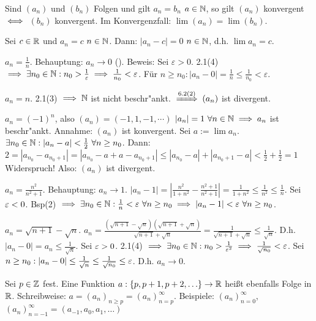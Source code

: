\documentclass[a4paper,twoside,DIV15,BCOR12mm]{scrbook}
\begin{document}
\begin{bemerkung}
Sind $(a_n)$ und $(b_n)$ Folgen und gilt $a_n = b_n$ \ffa $a\in\mathbb{N}$, so gilt $(a_n)$ konvergent $\iff$ $(b_n)$ konvergent. Im Konvergenzfall: $\lim(a_n) = \lim(b_n)$.
\end{bemerkung}

\begin{beispiele}
\item Sei $c \in \mathbb{R}$ und $a_n = c$ \ffa $n\in\mathbb{N}$. Dann: $|a_n - c| =0$ \ffa $n\in\mathbb{N}$, d.h. $\lim{a_n} = c$.
\item $a_n = \frac{1}{n}$. Behauptung: $a_n \to 0$ (). Beweis: Sei $\varepsilon > 0$. 2.1(4) $\implies \exists n_0 \in \mathbb{N}: n_0 > \frac{1}\varepsilon \implies \frac{1}{n_0} < \varepsilon$. Für $n \ge n_0: |a_n - 0| = \frac{1}{n} \le \frac{1}{n_0} < \varepsilon$.
\item $a_n = n$. 2.1(3) $\implies \mathbb{N}$ ist nicht beschr"ankt. $\folgtnach{6.2(2)} (a_n)$ ist divergent.
\item $a_n = (-1)^n$, also $(a_n) = (-1, 1, -1, \cdots)$ $|a_n|=1 \ \forall n\in\mathbb{N} \implies a_n$ ist beschr"ankt. Annahme: $(a_n)$ ist konvergent. Sei $a:=\lim a_n$. $\exists n_0\in\mathbb{N} : |a_n - a| < \frac{1}{2}\ \forall n \ge n_0$. Dann: $2=|a_{n_0}-a_{n_0+1}|=|a_{n_0}-a+a-a_{n_0+1}|\le|a_{n_0}-a|+|a_{n_0+1}-a|<\frac{1}{2} + \frac{1}{2}=1$ Widerspruch! Also: $(a_n)$ ist divergent.
\item $a_n = \frac{n^2}{n^2 + 1}$. Behauptung: $a_n \to 1$. $|a_n-1|=|\frac{n^2}{1+n^2}-\frac{n^2+1}{n^2+1}|=\frac{1}{1+n^2}\le\frac{1}{n^2}\le\frac{1}{n}$. Sei $\varepsilon<0$. Bsp(2) $\folgt \exists n_0 \in \MdN: \frac{1}{n}<\ep\ \forall n \ge n_0 \folgt |a_n-1|<\ep\ \forall n\ge n_0$.
\item $a_n = \sqrt{n+1}-\sqrt{n}$. $a_n = \frac{(\sqrt{n+1}-\sqrt{n})(\sqrt{n+1}+\sqrt{n})}{\sqrt{n+1}+\sqrt{n}}=\frac{1}{\sqrt{n+1}+\sqrt{n}}\le\frac{1}{\sqrt{n}}$. D.h. $|a_n-0|=a_n\le\frac{1}{\sqrt{n}}$. Sei $\varepsilon>0$. 2.1(4) $\implies \exists n_0\in\mathbb{N}: n_0>\frac{1}{{\varepsilon}^2}\implies\frac{1}{\sqrt{n_0}}<\varepsilon$. Sei $n \ge n_0: |a_n-0| \le \frac{1}{\sqrt{n}} \le \frac{1}{\sqrt{n_0}} \le \varepsilon$. D.h. $a_n \to 0$.
\end{beispiele}

\begin{bemerkung}
Sei $p\in\mathbb{Z}$ fest. Eine Funktion $a:\{p,p+1,p+2,\ldots\} \to \mathbb{R}$ heißt ebenfalls Folge in $\mathbb{R}$. Schreibweise: $a = (a_n)_{n\ge p} = (a_n)_{n = p}^\infty$. Beispiele: $(a_n)_{n=0}^\infty$, $(a_n)_{n=-1}^\infty = (a_{-1}, a_0, a_1, \ldots)$
\end{bemerkung}
\end{document}
